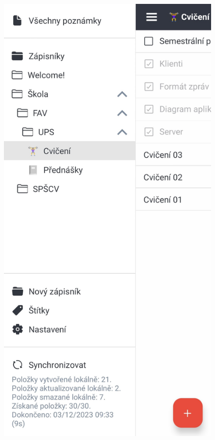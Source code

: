 \documentclass[czech, bc, kiv, he, iso690numb]{fasthesis}
\begin{document}
\begin{figure}[h!]
  \centering
  \begin{minipage}[h]{0.3\textwidth}
    \includegraphics[width=\textwidth]{img/BP-Runt/Joplin/hierarchie_Joplin_telefon.jpg}

\end{minipage}
\end{figure}
\end{document}
